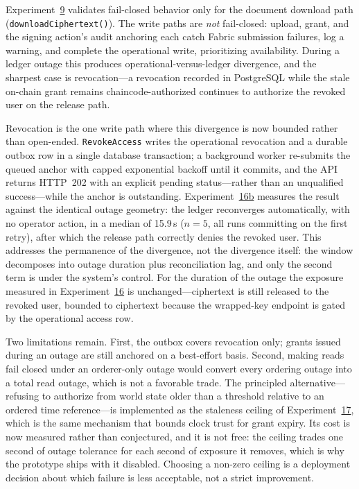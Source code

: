 \documentclass[preprint,12pt]{elsarticle}
\begin{document}
Experiment~\hyperref[sec:exp_failclosed]{9} validates fail-closed behavior only for the document download path (\texttt{downloadCiphertext()}). The write paths are \emph{not} fail-closed: upload, grant, and the signing action's audit anchoring each catch Fabric submission failures, log a warning, and complete the operational write, prioritizing availability. During a ledger outage this produces operational-versus-ledger divergence, and the sharpest case is revocation---a revocation recorded in PostgreSQL while the stale on-chain grant remains chaincode-authorized continues to authorize the revoked user on the release path.

Revocation is the one write path where this divergence is now bounded rather than open-ended. \texttt{RevokeAccess} writes the operational revocation and a durable outbox row in a single database transaction; a background worker re-submits the queued anchor with capped exponential backoff until it commits, and the API returns HTTP~202 with an explicit pending status---rather than an unqualified success---while the anchor is outstanding. Experiment~\hyperref[sec:exp_orderer_reconcile]{16b} measures the result against the identical outage geometry: the ledger reconverges automatically, with no operator action, in a median of 15.9\,s ($n=5$, all runs committing on the first retry), after which the release path correctly denies the revoked user. This addresses the permanence of the divergence, not the divergence itself: the window decomposes into outage duration plus reconciliation lag, and only the second term is under the system's control. For the duration of the outage the exposure measured in Experiment~\hyperref[sec:exp_orderer_outage]{16} is unchanged---ciphertext is still released to the revoked user, bounded to ciphertext because the wrapped-key endpoint is gated by the operational access row.

Two limitations remain. First, the outbox covers revocation only; grants issued during an outage are still anchored on a best-effort basis. Second, making reads fail closed under an orderer-only outage would convert every ordering outage into a total read outage, which is not a favorable trade. The principled alternative---refusing to authorize from world state older than a threshold relative to an ordered time reference---is implemented as the staleness ceiling of Experiment~\hyperref[sec:exp_timeanchor]{17}, which is the same mechanism that bounds clock trust for grant expiry. Its cost is now measured rather than conjectured, and it is not free: the ceiling trades one second of outage tolerance for each second of exposure it removes, which is why the prototype ships with it disabled. Choosing a non-zero ceiling is a deployment decision about which failure is less acceptable, not a strict improvement.
\end{document}
